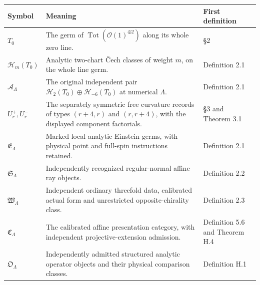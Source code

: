 \documentclass[
  english,
  11pt,
  reqno]{amsart}
\newcounter{none} %
\begin{document}
{\def\LTcaptype{none} %
\begin{longtable}[]{@{}
  >{\raggedright\arraybackslash}p{}
  >{\raggedright\arraybackslash}p{}
  >{\raggedright\arraybackslash}p{}@{}}
\toprule\noalign{}
\begin{minipage}[b]{\linewidth}\raggedright
Symbol
\end{minipage} & \begin{minipage}[b]{\linewidth}\raggedright
Meaning
\end{minipage} & \begin{minipage}[b]{\linewidth}\raggedright
First definition
\end{minipage} \\
\midrule\noalign{}
\endhead
\bottomrule\noalign{}
\endlastfoot
\(T_0\) & The germ of \(\operatorname{Tot}(\mathcal O(1)^{\oplus2})\)
along its whole zero line. & §2 \\
\(\mathscr H_m(T_0)\) & Analytic two-chart Čech classes of weight \(m\),
on the whole line germ. & Definition 2.1 \\
\(\mathcal A_\Lambda\) & The original independent pair
\(\mathscr H_2(T_0)\oplus\mathscr H_{-6}(T_0)\) at numerical
\(\Lambda\). & Definition 2.1 \\
\(U_r^+,U_r^-\) & The separately symmetric free curvature records of
types \((r+4,r)\) and \((r,r+4)\), with the displayed component
factorials. & §3 and Theorem 3.1 \\
\(\mathfrak E_\Lambda\) & Marked local analytic Einstein germs, with
physical point and full-spin instructions retained. & Definition 2.1 \\
\(\mathfrak S_\Lambda\) & Independently recognized regular-normal affine
ray objects. & Definition 2.2 \\
\(\mathfrak W_\Lambda\) & Independent ordinary threefold data,
calibrated actual form and unrestricted opposite-chirality class. &
Definition 2.3 \\
\(\mathfrak C_\Lambda\) & The calibrated affine presentation category,
with independent projective-extension admission. & Definition 5.6 and
Theorem H.4 \\
\(\mathfrak O_\Lambda\) & Independently admitted structured analytic
operator objects and their physical comparison classes. & Definition
H.1 \\
\end{longtable}
}
\end{document}
